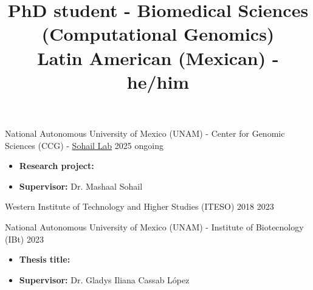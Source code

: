 \documentclass{simplecv}
\title{PhD student - Biomedical Sciences (Computational Genomics) \\ \footnotesize{Latin American (Mexican) - he/him}}
\begin{document}
\setmainfont{XCharter} %
\setsansfont{Inter} %
\nocite{*}
\makecvheader{}
\thispagestyle{firstpage}

%
%


    {National Autonomous University of Mexico (UNAM) - Center for Genomic Sciences (CCG) - \href{https://www.sohaillab.com/}{Sohail Lab}} %
    {} %
    {2025} %
    {ongoing} %
    {
        \vspace{-11pt}
        \begin{itemize}[leftmargin=*]
        \setlength{\itemsep}{0cm}
          \item \textbf{Research project:} 
          \item \textbf{Supervisor:} Dr. Mashaal Sohail
        \end{itemize}
    } %

    {Western Institute of Technology and Higher Studies (ITESO)} %
    {} %
    {2018} %
    {2023} %
    {} %


    {National Autonomous University of Mexico (UNAM) - Institute of Biotecnology (IBt)} %
    {} %
    {} %
    {2023} %
    {
        \vspace{-11pt}
        \begin{itemize}[leftmargin=*]
        \setlength{\itemsep}{0cm}
            \item \textbf{Thesis title:} 
            \item \textbf{Supervisor:} Dr. Gladys Iliana Cassab López
        \end{itemize}
    } %
\end{document}

